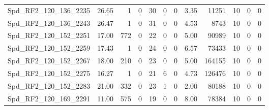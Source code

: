 \begin{longtable}[c]{@{}lrrrrrrrrrrr@{}}
Spd\_RF2\_120\_136\_2235     & 26.65                  & 1                       & 0                       & 30                     & 0                       & 0                       & 3.35                    & 11251                    & 10                       & 0                        & 0                        \\
Spd\_RF2\_120\_136\_2243     & 26.47                  & 1                       & 0                       & 31                     & 0                       & 0                       & 4.53                    & 8743                     & 10                       & 0                        & 0                        \\
Spd\_RF2\_120\_152\_2251     & 17.00                  & 772                     & 0                       & 22                     & 0                       & 0                       & 5.00                    & 90989                    & 10                       & 0                        & 0                        \\
Spd\_RF2\_120\_152\_2259     & 17.43                  & 1                       & 0                       & 24                     & 0                       & 0                       & 6.57                    & 73433                    & 10                       & 0                        & 0                        \\
Spd\_RF2\_120\_152\_2267     & 18.00                  & 210                     & 0                       & 23                     & 0                       & 0                       & 5.00                    & 164155                   & 10                       & 0                        & 0                        \\
Spd\_RF2\_120\_152\_2275     & 16.27                  & 1                       & 0                       & 21                     & 6                       & 0                       & 4.73                    & 126476                   & 10                       & 0                        & 0                        \\
Spd\_RF2\_120\_152\_2283     & 21.00                  & 332                     & 0                       & 23                     & 1                       & 0                       & 2.00                    & 80188                    & 10                       & 0                        & 0                        \\
Spd\_RF2\_120\_169\_2291     & 11.00                  & 575                     & 0                       & 19                     & 0                       & 0                       & 8.00                    & 78384                    & 10                       & 0                        & 0                        \\

\end{longtable}
